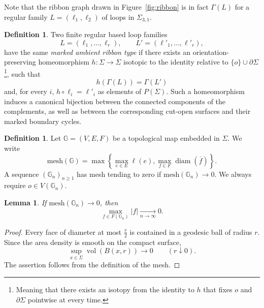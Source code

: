 \documentclass[11pt,a4paper,reqno]{article}
\newtheorem{lemma}[theorem]{Lemma}
\theoremstyle{definition}
\newtheorem{definition}[theorem]{Definition}
\theoremstyle{remark}
\newcommand\Gbb{{\mathbb{G}}}
\newcommand\mesh{{\mathrm{mesh}}}
\begin{document}
Note that the ribbon graph drawn in Figure~\ref{fig:ribbon} is in fact $\Gamma(L)$ for a regular family $L=(\ell_1,\ell_2)$ of loops in $\Sigma_{3,1}$.

\begin{definition}\label{def:same-ribbon-type}
Two finite regular based loop families
\[
 L=(\ell_1,\ldots,\ell_r),
 \qquad
 L'=(\ell'_1,\ldots,\ell'_r),
\]
have the same \emph{marked ambient ribbon type} if there exists an orientation-preserving homeomorphism $h:\Sigma\longrightarrow\Sigma$ isotopic to the identity relative to $\{o\}\cup\partial\Sigma$\footnote{Meaning that there exists an isotopy from the identity to $h$ that fixes $o$ and $\partial\Sigma$ pointwise at every time.}, such that
\[
 h(\Gamma(L))=\Gamma(L')
\]
and, for every $i$, $h\circ\ell_i=\ell'_i$ as elements of $P(\Sigma)$. Such a homeomorphism induces a canonical bijection between the connected components of the complements, as well as between the corresponding cut-open surfaces and their marked boundary cycles.
\end{definition}

\begin{definition}\label{def:mesh-rewrite}
Let $\Gbb=(V,E,F)$ be a topological map embedded in $\Sigma$. We write
\[
 \mesh(\Gbb)
 =
 \max\left\{
 \max_{e\in E}\ell(e),
 \max_{f\in F}\operatorname{diam}(\overline f)
 \right\}.
\]
A sequence $(\Gbb_n)_{n\geq1}$ has mesh tending to zero if $\mesh(\Gbb_n)\to0$. We always require $o\in V(\Gbb_n)$.
\end{definition}

\begin{lemma}\label{lem:mesh-implies-face-area}
If $\mesh(\Gbb_n)\to0$, then
\[
 \max_{f\in F(\Gbb_n)}|f|\xrightarrow[n\to\infty]{}0.
\]
\end{lemma}

\begin{proof}
Every face of diameter at most $\frac r2$ is contained in a geodesic ball of radius $r$. Since the area density is smooth on the compact surface,
\[
 \sup_{x\in\Sigma}\operatorname{vol}(B(x,r))\longrightarrow0
 \qquad (r\downarrow0).
\]
The assertion follows from the definition of the mesh.
\end{proof}
\end{document}
